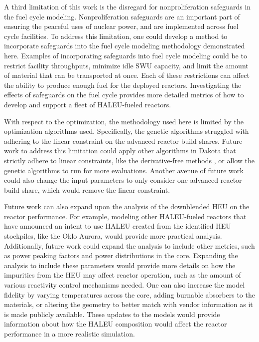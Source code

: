 A third limitation of this work is the disregard for nonproliferation 
safeguards in the fuel cycle modeling. Nonproliferation safeguards 
are an important part of ensuring the peaceful uses of nuclear 
power, and are implemented across fuel cycle facilities. To 
address this limitation, one could develop 
a method to incorporate safeguards into the fuel cycle modeling
methodology demonstrated here. 
Examples of incorporating safeguards into fuel cycle modeling could 
be to restrict facility throughputs, minimize idle \gls{SWU} 
capacity, and limit the amount of material that can be transported 
at once. Each of these restrictions can affect the ability 
to produce enough fuel for the deployed reactors. Investigating 
the effects of safeguards on the fuel cycle provides more 
detailed metrics of how to develop and support a fleet of 
\gls{HALEU}-fueled reactors. 

With respect to the optimization, the methodology used here is 
limited by the optimization algorithms used. Specifically, the 
genetic algorithms struggled with adhering to the linear constraint 
on the advanced reactor build shares. Future work to address this 
limitation could apply other algorithms in Dakota that strictly 
adhere to linear constraints, like the derivative-free methods 
\cite{adams_dakota_2021}, or allow the genetic algorithms to 
run for more evaluations. Another avenue of future work could 
also change the input parameters to only consider one advanced 
reactor build share, which would remove the linear constraint. 

Future work can also expand upon the analysis of the downblended 
\gls{HEU} on the reactor performance. For example, modeling other 
\gls{HALEU}-fueled reactors that 
have announced an intent to use \gls{HALEU} created from the identified 
\gls{HEU} stockpiles, like the Oklo Aurora, would provide more 
practical analysis. Additionally, future work could expand 
the analysis to include other metrics, such as power peaking factors and 
power distributions in the core. 
Expanding the analysis to include these parameters would provide 
more details on how the impurities from the \gls{HEU} may 
affect reactor operation, such as the amount of various reactivity 
control mechanisms needed. One can also increase the 
model fidelity by varying temperatures across the core, 
adding burnable absorbers to the materials, or altering the 
geometry to better match with vendor information as it is made 
publicly available. These 
updates to the models would provide information 
about how the \gls{HALEU} composition would affect the 
reactor performance in a more realistic simulation. 